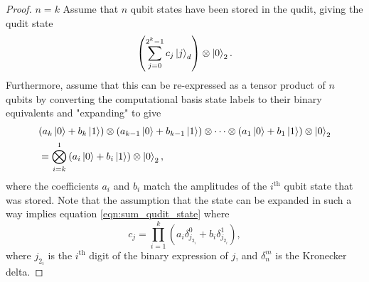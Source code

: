 \begin{appendices}
\begin{proof}
    $n = k$\newline
    Assume that $n$ qubit states have been stored in the qudit, giving the qudit state
    \begin{equation}
        \left(\sum_{j=0}^{2^k - 1}c_j\ket{j}_d\right)\otimes\ket{0}_2.
        \label{eqn:sum_qudit_state}
    \end{equation}
    Furthermore, assume that this can be re-expressed as a tensor product of $n$ qubits by converting the computational basis state labels to their binary equivalents and "expanding" to give
    \begin{align}
        &(a_k\ket{0} + b_k\ket{1})\otimes(a_{k-1}\ket{0} + b_{k-1}\ket{1})\otimes\cdots\otimes(a_1\ket{0} + b_1\ket{1})\otimes\ket{0}_2\\
        &=\bigotimes_{i = k}^{1}\left(a_i\ket{0} + b_i\ket{1}\right)\otimes\ket{0}_2,
    \end{align}
    where the coefficients $a_{i}$ and $b_{i}$ match the amplitudes of the $i^{\text{th}}$ qubit state that was stored.
    Note that the assumption that the state can be expanded in such a way implies equation \ref{eqn:sum_qudit_state} where
    \begin{equation}
        c_j = \prod_{i=1}^{k}(a_i \delta^{0}_{j_{2_i}} + b_i\delta^{1}_{j_{2_i}}),
    \end{equation}
    where $j_{2_i}$ is the $i^{\text{th}}$ digit of the binary expression of $j$, and $\delta^m_n$ is the Kronecker delta.\newline
    \newpage


\end{proof}
\end{appendices}

